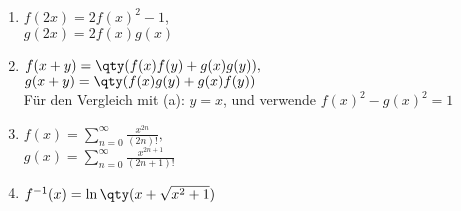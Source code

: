 \begin{enumerate}[label=(\alph*)]
    \item $f(2x)=2f(x)^2-1$, \\
    $g(2x)=2f(x)g(x)$
    \item $f(x+y)=\qty(f(x)f(y)+g(x)g(y)),$\\
    $g(x+y)=\qty(f(x)g(y)+g(x)f(y))$\\
    Für den Vergleich mit (a): $y=x$, und verwende $f(x)^2-g(x)^2=1$
    \item $f(x)=\sum\limits_{n=0}^\infty \frac{x^{2n}}{(2n)!},$\\
    $g(x)=\sum\limits_{n=0}^\infty \frac{x^{2n+1}}{(2n+1)!}$
    \item $f^{-1}(x)=\ln\qty(x+\sqrt{x^2+1})$
\end{enumerate}
